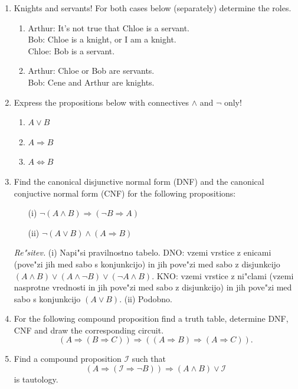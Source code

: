 \documentclass[11pt,paper=b5,footinclude,headinclude]{scrbook} %
\begin{document}
\begin{enumerate}
\begin{enumerate}
\end{enumerate}
\item Knights and servants! For both cases below (separately) determine
the roles.
\begin{enumerate}
\item Arthur: It's not true that Chloe is a servant.\\
Bob: Chloe is a knight, or I am a knight.\\
Chloe: Bob is a servant.
\item Arthur: Chloe or Bob are servants.\\
Bob: Cene and Arthur are knights.
\end{enumerate}
\item Express the propositions below with connectives $\wedge$ and $\neg$
only!
\begin{enumerate}
\item $A\vee B$
\item $A\Rightarrow B$
\item $A\Leftrightarrow B$
\end{enumerate}


\item Find the canonical disjunctive normal form (DNF) and the canonical conjuctive normal form (CNF) for the following propositions:
\begin{enumerate}
\item[(i)] $\neg(A\wedge B) \Rightarrow (\neg B \Rightarrow A)$
\item[(ii)] $\neg (A\vee B) \wedge (A \Rightarrow B)$
\end{enumerate}

\emph{Re"sitev.} (i) Napi"si pravilnostno tabelo. DNO: vzemi vrstice z enicami (pove"zi jih med sabo s konjunkcijo) in jih pove"zi med sabo z disjunkcijo
$(A\wedge B) \vee (A\wedge \neg B) \vee (\neg A \wedge B)$. KNO: vzemi vrstice z ni"clami (vzemi nasprotne vrednosti in jih pove"zi med sabo z disjunkcijo) in jih pove"zi med sabo s konjunkcijo $(A \vee B)$. (ii) Podobno.

\item For the following compound proposition find  a truth table, determine DNF, CNF and draw the corresponding circuit.
$$
(A \Rightarrow (B\Rightarrow C)) \Rightarrow ((A\Rightarrow B)\Rightarrow (A \Rightarrow C)).
$$


\item Find a compound proposition $\mathcal{I}$ such that
$$(A\Rightarrow (\mathcal{I} \Rightarrow \neg B))\Rightarrow (A\wedge B) \vee \mathcal{I}$$
is tautology.


\end{enumerate}
\end{document}
